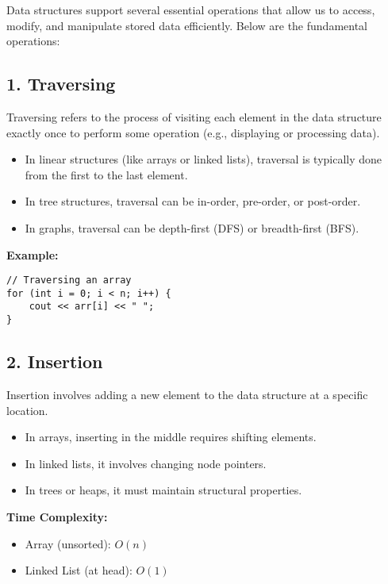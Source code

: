 Data structures support several essential operations that allow us to access, modify, and manipulate stored data efficiently. Below are the fundamental operations:

\subsection*{\large \textbf{1. Traversing}}

Traversing refers to the process of visiting each element in the data structure exactly once to perform some operation (e.g., displaying or processing data).

\begin{itemize}
  \item In linear structures (like arrays or linked lists), traversal is typically done from the first to the last element.
  \item In tree structures, traversal can be in-order, pre-order, or post-order.
  \item In graphs, traversal can be depth-first (DFS) or breadth-first (BFS).
\end{itemize}

\textbf{Example:}
\begin{lstlisting}
// Traversing an array
for (int i = 0; i < n; i++) {
    cout << arr[i] << " ";
}
\end{lstlisting}

\subsection*{\large \textbf{2. Insertion}}

Insertion involves adding a new element to the data structure at a specific location.

\begin{itemize}
  \item In arrays, inserting in the middle requires shifting elements.
  \item In linked lists, it involves changing node pointers.
  \item In trees or heaps, it must maintain structural properties.
\end{itemize}

\textbf{Time Complexity:}
\begin{itemize}
  \item Array (unsorted): $O(n)$
  \item Linked List (at head): $O(1)$
\end{itemize}

